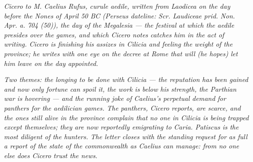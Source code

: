 
\textit{Cicero to M. Caelius Rufus, curule aedile,
written from Laodicea on the day before the Nones of
April 50 BC (Perseus dateline: \textit{Scr. Laudiceae
prid. Non. Apr. a. 704 (50)}), the day of the Megalesia
--- the festival at which the aedile presides over the
games, and which Cicero notes catches him in the act
of writing. Cicero is finishing his assizes in Cilicia
and feeling the weight of the province; he writes
with one eye on the decree at Rome that will (he hopes)
let him leave on the day appointed.}

\textit{Two themes: the longing to be done with
Cilicia --- the reputation has been gained and now only
fortune can spoil it, the work is below his strength,
the Parthian war is hovering --- and the running joke
of Caelius's perpetual demand for panthers for the
aedilician games. The panthers, Cicero reports, are
scarce, and the ones still alive in the province
complain that no one in Cilicia is being trapped except
themselves; they are now reportedly emigrating to
Caria. Patiscus is the most diligent of the hunters.
The letter closes with the standing request for as full
a report of the state of the commonwealth as Caelius
can manage: from no one else does Cicero trust the
news.}
